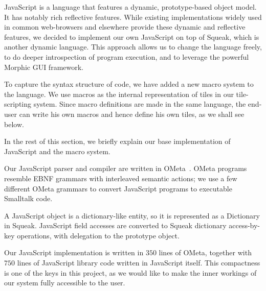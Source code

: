 \label{sec:js}

  JavaScript is a language that features a dynamic, prototype-based object
model.  It has notably rich reflective features.  While existing
implementations widely used in common web-browsers and elsewhere
provide these dynamic and reflective features, we decided to implement
our own JavaScript on top of Squeak, which is another
dynamic language.  This approach allows us to change the
language freely, to do deeper introspection of program execution, and
to leverage the powerful Morphic GUI framework.

  To capture the syntax structure of code, we have added a new macro
system to the language.  We use macros as the internal
representation of tiles in our tile-scripting system.  Since macro definitions are
made in the same language, the end-user can write his own macros and hence define his own tiles, as we shall see below.

  In the rest of this section, we briefly explain our base implementation of
JavaScript and the macro system.


  Our JavaScript parser and compiler are written in OMeta~\cite{wp07ometa}.
OMeta programs resemble EBNF grammars with interleaved
semantic actions;
we use a few different OMeta grammars to
convert JavaScript programs to executable Smalltalk code.

  A JavaScript object is a dictionary-like entity, so it is
represented as a {\sf Dictionary} in Squeak.  JavaScript field accesses
are converted to Squeak dictionary access-by-key operations, with
delegation to the prototype object.

  Our JavaScript implementation is written in $350$ lines of OMeta, together with
$750$ lines of JavaScript library code written in JavaScript itself.  This
compactness is one of the keys in this project, as we would like to
make the inner workings of our system fully accessible to the user.

\label{ssec:macro system}


